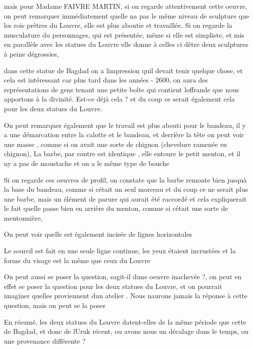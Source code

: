 \documentclass{article}
\begin{document}
mais pour Madame FAIVRE MARTIN, si on regarde attentivement cette
oeuvre, on peut remarquer immédiatement qu{\textquotesingle}elle
n{\textquotesingle}a pas le même niveau de sculpture que les rois
prêtres du Louvre, elle est plus aboutie et travaillée. Si on regarde
la musculature du personnages, qui est présentée, même si elle est
simpliste, et mis en parallèle avec les statues du Louvre elle donne à
celles ci d{\textquotesingle}être deux sculptures à peine dégrossies,  

dans cette statue de Bagdad on a l{\textquotesingle}impression
qu{\textquotesingle}il devait tenir quelque chose, et cela est
intéressant car plus tard dans les années - 2600, on aura des
représentations de gens tenant une petite boîte qui contient
l{\textquotesingle}offrande que nous apportons à la divinité. Est-ce
déjà cela ? et du coup ce serait également cela pour les deux statues
du Louvre.

On peut remarquer également que le travail est plus abouti pour le
bandeau, il y a une démarcation entre la calotte et le bandeau, et
derrière la tête on peut voir une masse , comme si on avait une sorte
de chignon (chevelure ramenée en chignon),  La barbe, par contre est
identique , elle entoure le petit menton, et il n{\textquotesingle}y a
pas de moustache et on a le même type de bouche

Si on regarde ces oeuvres de profil, on constate que la barbe remonte
bien jusqu{\textquotesingle}à la base du bandeau, comme si
c{\textquotesingle}était un seul morceau et du coup ce ne serait plus
une barbe, mais un élément de parure qui aurait été raccordé et cela
expliquerait le fait qu{\textquotesingle}elle passe bien en arrière du
menton, comme si c{\textquotesingle}était une sorte de mentonnière,

On peut voir qu{\textquotesingle}elle est également incisée de lignes
horizontales

Le sourcil est fait en une seule ligne continue, les yeux étaient
incrustées et la forme du visage est la même que ceux du Louvre

On peut aussi se poser la question, s{\textquotesingle}agit-il
d{\textquotesingle}une oeuvre inachevée ?, on peut en effet se poser la
question pour les deux statues du Louvre, et on pourrait imaginer
qu{\textquotesingle}elles proviennent d{\textquotesingle}un atelier .
Nous n{\textquotesingle}aurons jamais la réponse à cette question, mais
on peut se la poser

En résumé, les deux statues du Louvre datent-elles de la même période
que cette de Bagdad, et donc de l{\textquotesingle}Uruk récent, ou
avons nous un décalage dans le temps, ou une provenance différente ?
\end{document}
